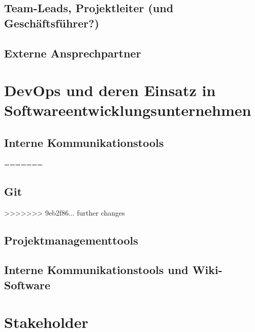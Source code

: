 \subsection{Team-Leads, Projektleiter (und Geschäftsführer?)}

\subsection{Externe Ansprechpartner}

\section{DevOps und deren Einsatz in Softwareentwicklungsunternehmen}

\subsection{Interne Kommunikationstools}
=======
\subsection{Git}
>>>>>>> 9eb2f86... further changes

\subsection{Projektmanagementtools}

\subsection{Interne Kommunikationstools und Wiki-Software}

\section{Stakeholder}